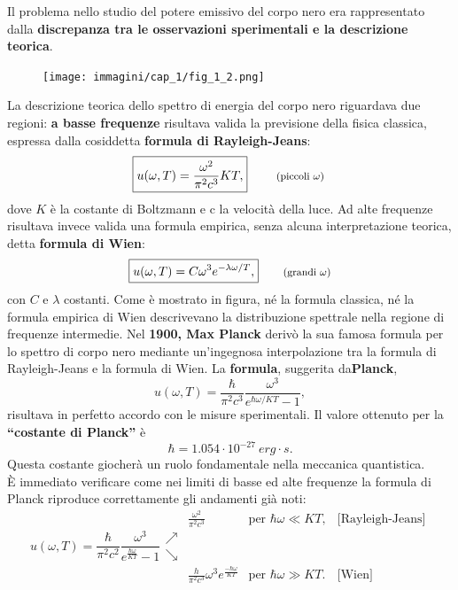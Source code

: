 Il problema nello studio del potere emissivo del corpo nero era rappresentato dalla \textbf{discrepanza tra le osservazioni sperimentali e la descrizione teorica}.
\newpage
	\begin{figure}[!htbp]
		\begin{center}
			\texttt{[image: immagini/cap\_1/fig\_1\_2.png]}
		\end{center}
	\end{figure}
	
La descrizione teorica dello spettro di energia del corpo nero riguardava due regioni: \textbf{a basse frequenze} risultava valida la previsione della fisica classica, espressa dalla cosiddetta \textbf{formula di Rayleigh-Jeans}:
	\begin{equation}
		\boxed{
			u(\omega , T)= \frac{\omega ^2}{\pi ^2 c^3}KT,
		}
			\qquad \textrm{ \footnotesize{(piccoli $\omega$)} }
	\end{equation}
dove $K$ è la costante di Boltzmann e c la velocità della luce. Ad alte frequenze risultava invece valida una formula empirica, senza alcuna interpretazione teorica, detta \textbf{formula di Wien}:
	\begin{equation}
		\boxed{
			u(\omega ,T)= C \omega ^3 e^{-\lambda \omega /T},
		}
			\qquad \textrm{\footnotesize{(grandi $\omega$)}}
	\end{equation}
con $C$ e $\lambda$ costanti. Come è mostrato in figura, né la formula classica, né  la formula empirica di Wien descrivevano la distribuzione spettrale nella regione di frequenze intermedie.
Nel \textbf{1900, Max Planck} derivò la sua famosa formula per lo spettro di corpo nero mediante un'ingegnosa interpolazione tra la formula di Rayleigh-Jeans e la formula di Wien. La \textbf{formula}, suggerita da\textbf{Planck},
	\begin{equation}
	\boxed{\boxed{
		u(\omega, T) = \frac{\hbar}{\pi ^2 c^3}\frac{\omega ^3}{e^{\hbar \omega / KT}-1},
	}}
\end{equation}
risultava in perfetto accordo con le misure sperimentali. Il valore ottenuto per la \textbf{``costante di Planck''} è
\[ \boxed{\hbar = 1.054 \cdot 10^{-27} \ erg\cdot s.}\]
Questa costante giocherà un ruolo fondamentale nella meccanica quantistica.\\

È immediato verificare come nei limiti di basse ed alte frequenze la formula di Planck riproduce correttamente gli andamenti già noti:\\
\begin{equation}
u(\omega , T) =\frac{\hbar}{\pi ^2 c^2} \frac{\omega ^3}{e^{\frac{\hbar \omega}{KT}} -1} 
\begin{array}{clcc}
 & \displaystyle{\frac{\omega ^2}{\pi ^2 c^3} } & \textrm{per } \hbar \omega \ll KT, & \textrm{[Rayleigh-Jeans]}\\
\nearrow \\
\searrow \\
 & \displaystyle{\frac{h}{\pi ^2 c^3}\omega ^3 e^{\frac{-\hbar \omega}{KT}}} & \textrm{per }  \hbar \omega \gg KT .& \textrm{[Wien]}
\end{array}
\end{equation}

